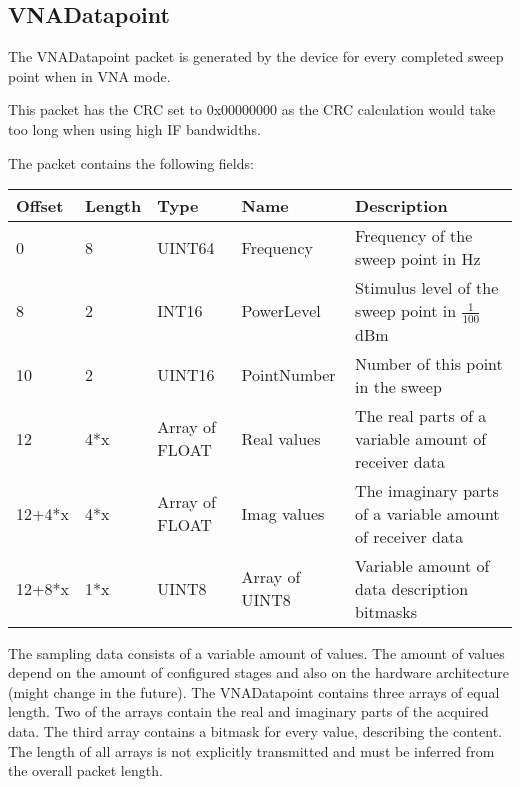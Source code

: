 \documentclass[a4paper,11pt]{article}
\newcommand\danger[1][5ex]{%
  \renewcommand\stacktype{L}%
  \scaleto{\stackon[1.3pt]{\color{red}$\triangle$}{\tiny !}}{#1}%
}
\newenvironment{important}[1][]{%
   \begin{mdframed}[%
      backgroundcolor={red!15}, hidealllines=true,
      skipabove=0.7\baselineskip, skipbelow=0.7\baselineskip,
      splitbottomskip=2pt, splittopskip=4pt, #1]%
   \makebox[0pt]{%
      \smash{%
         \hspace*{-45pt}%
         \raisebox{-5pt}{%
            {\danger}%
         }%
      }%
   }%
}{\end{mdframed}}
\begin{document}
\subsection{VNADatapoint}
The VNADatapoint packet is generated by the device for every completed sweep point when in VNA mode.
\begin{important}
This packet has the CRC set to 0x00000000 as the CRC calculation would take too long when using high IF bandwidths.
\end{important}

The packet contains the following fields:
\begin{ThreePartTable}
\setlength\tabcolsep{3pt}

\begin{longtable}{p{} |  p{}  |  p{}| p{} | p{}}
\toprule
\textbf{Offset} &\textbf{Length} &\textbf{Type} & \textbf{Name} &\textbf{Description} \\ 
\hline
\endhead
\midrule[\heavyrulewidth]
\endfoot  
\midrule[\heavyrulewidth]
\endlastfoot

0 & 8 & UINT64 & Frequency & Frequency of the sweep point in Hz\\
8 & 2 & INT16 & PowerLevel & Stimulus level of the sweep point in $\frac{1}{100}$dBm \\
10 & 2 & UINT16 & PointNumber & Number of this point in the sweep \\
12 & 4*x & Array of FLOAT & Real values & The real parts of a variable amount of receiver data \\
12+4*x & 4*x & Array of FLOAT & Imag values & The imaginary parts of a variable amount of receiver data \\
12+8*x & 1*x & UINT8 & Array of UINT8 & Variable amount of data description bitmasks\\
\end{longtable}   
\end{ThreePartTable}

The sampling data consists of a variable amount of values. The amount of values depend on the amount of configured stages and also on the hardware architecture (might change in the future). The VNADatapoint contains three arrays of equal length. Two of the arrays contain the real and imaginary parts of the acquired data. The third array contains a bitmask for every value, describing the content. The length of all arrays is not explicitly transmitted and must be inferred from the overall packet length.
\end{document}

